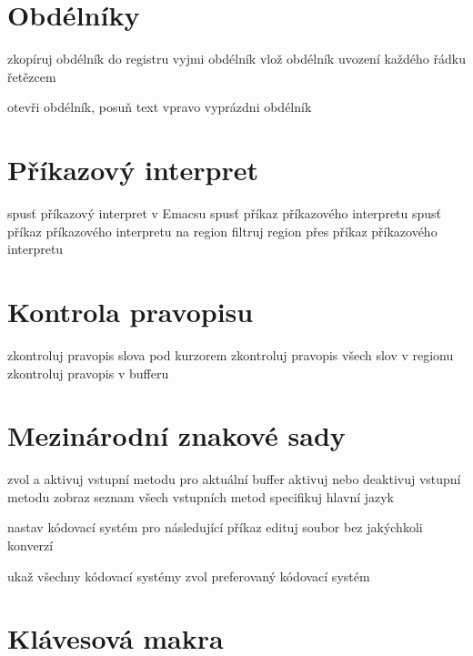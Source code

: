 \section{Obdélníky}

 zkopíruj obdélník do registru
 vyjmi obdélník
 vlož obdélník
 uvození každého řádku řetězcem

 otevři obdélník, posuň text vpravo
 vyprázdni obdélník

\section{Příkazový interpret}

 spusť příkazový interpret v Emacsu
 spusť příkaz příkazového interpretu
 spusť příkaz příkazového interpretu na region
 filtruj region přes příkaz příkazového interpretu

\section{Kontrola pravopisu}

 zkontroluj pravopis slova pod kurzorem
 zkontroluj pravopis všech slov v regionu
 zkontroluj pravopis v bufferu

\section{Mezinárodní znakové sady}

 zvol a aktivuj vstupní metodu pro aktuální buffer
 aktivuj nebo deaktivuj vstupní metodu
 zobraz seznam všech vstupních metod
 specifikuj hlavní jazyk

 nastav kódovací systém pro následující příkaz
 edituj soubor bez jakýchkoli konverzí

 ukaž všechny kódovací systémy
 zvol preferovaný kódovací systém

\section{Klávesová makra}

